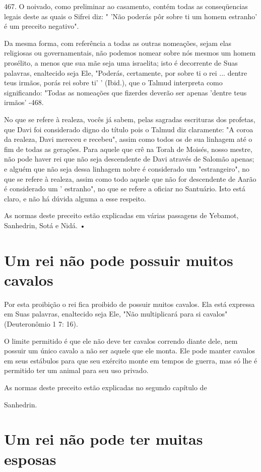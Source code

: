 \begin{itemize}
\begin{enumrate}
\begin{itemize}
\begin{itemize}
\begin{itemize}
467. O noivado, como preliminar ao casamento, contém todas as
conseqüencias legais deste
as quais o Sifrei diz: " 'Não poderás pôr sobre ti um homem estranho' é
um preceito negativo".

Da mesma forma, com referência a todas as outras nomeações, se­jam elas
religiosas ou governamentais, não podemos nomear sobre nós mes­mos um
homem prosélito, a menos que sua mãe seja uma israelita; isto é
decor­rente de Suas palavras, enaltecido seja Ele, "Poderás, certamente,
por sobre ti o rei ... dentre teus irmãos, porás rei sobre ti' '
(Ibid.), que o Talmud interpreta como significando: "Todas as nomeações
que fizerdes deverão ser apenas 'dentre teus irmãos' -468.

No que se refere à realeza, vocês já sabem, pelas sagradas escrituras
dos profetas, que Davi foi considerado digno do título pois o Talmud diz
clara­mente: "A coroa da realeza, Davi mereceu e recebeu", assim como
todos os de sua linhagem até o fim de todas as gerações. Para aquele que
crê na Torah de Moisés, nosso mestre, não pode haver rei que não seja
descendente de Davi atra­vés de Salomão apenas; e alguém que não seja
dessa linhagem nobre é conside­rado um "estrangeiro", no que se refere à
realeza, assim como todo aquele que não for descendente de Aarão é
considerado um ' estranho", no que se refere a oficiar no Santuário.
Isto está claro, e não há dúvida alguma a esse respeito.

As normas deste preceito estão explicadas em várias passagens de
Yebamot, Sanhedrin, Sotá e Nidá. •

\section{Um rei não pode possuir muitos cavalos}

Por esta proibição o rei fica proibido de possuir muitos cavalos. Ela
está expressa em Suas palavras, enaltecido seja Ele, "Não multiplicará
para si cavalos" (Deuteronômio 1 7: 16).

O limite permitido é que ele não deve ter cavalos correndo diante dele,
nem possuir um único cavalo a não ser aquele que ele monta. Ele pode
manter cavalos em seus estábulos para que seu exército monte em tempos
de guerra, mas só lhe é permitido ter um animal para seu uso privado.


As normas deste preceito estão explicadas no segundo capítulo de


Sanhedrin.

\section{Um rei não pode ter muitas esposas}


\end{itemize}
\end{itemize}
\end{itemize}
\end{enumrate}
\end{itemize}
